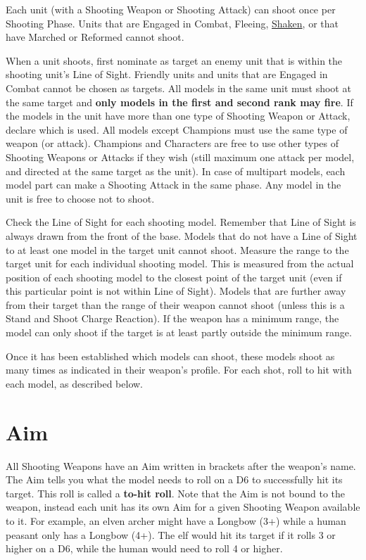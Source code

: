 Each unit (with a Shooting Weapon or Shooting Attack) can shoot once per Shooting Phase. Units that are Engaged in Combat, Fleeing, \hyperref[shaken]{Shaken}, or that have Marched or Reformed cannot shoot.
\par
When a unit shoots, first nominate as target an enemy unit that is within the shooting unit's Line of Sight. Friendly units and units that are Engaged in Combat cannot be chosen as targets. All models in the same unit must shoot at the same target and \textbf{only models in the first and second rank may fire}. If the models in the unit have more than one type of Shooting Weapon or Attack, declare which is used. All \rnf{} models except Champions must use the same type of weapon (or attack). Champions and Characters are free to use other types of Shooting Weapons or Attacks if they wish (still maximum one attack per model, and directed at the same target as the unit). In case of multipart models, each model part can make a Shooting Attack in the same phase. Any model in the unit is free to choose not to shoot.
\par
Check the Line of Sight for each shooting model. Remember that Line of Sight is always drawn from the front of the base. Models that do not have a Line of Sight to at least one model in the target unit cannot shoot. Measure the range to the target unit for each individual shooting model. This is measured from the actual position of each shooting model to the closest point of the target unit (even if this particular point is not within Line of Sight). Models that are further away from their target than the range of their weapon cannot shoot (unless this is a Stand and Shoot Charge Reaction). If the weapon has a minimum range, the model can only shoot if the target is at least partly outside the minimum range.
\par
Once it has been established which models can shoot, these models shoot as many times as indicated in their weapon's profile. For each shot, roll to hit with each model, as described below.

\section{Aim}
\label{aim}

All Shooting Weapons have an Aim written in brackets after the weapon's name. The Aim tells you what the model needs to roll on a D6 to successfully hit its target. This roll is called a \textbf{to-hit roll}. Note that the Aim is not bound to the weapon, instead each unit has its own Aim for a given Shooting Weapon available to it. For example, an elven archer might have a Longbow (3+) while a human peasant only has a Longbow (4+). The elf would hit its target if it rolls 3 or higher on a D6, while the human would need to roll 4 or higher.

